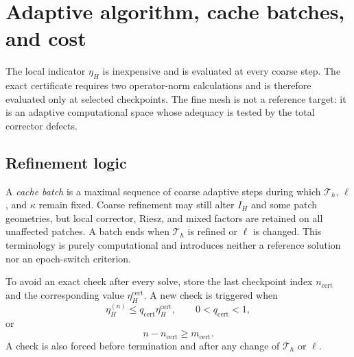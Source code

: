\section{Adaptive algorithm, cache batches, and cost}
\label{sec:adaptive}

The local indicator $\eta_H$ is inexpensive and is evaluated at every
coarse step.  The exact certificate requires two operator-norm calculations
and is therefore evaluated only at selected checkpoints.  The fine mesh is
not a reference target: it is an adaptive computational space whose
adequacy is tested by the total corrector defects.

\subsection{Refinement logic}
\label{sec:adaptive-logic}

A \emph{cache batch} is a maximal sequence of coarse adaptive steps during
which $\mathcal T_h$, $\ell$, and $\kappa$ remain fixed.  Coarse refinement
may still alter $I_H$ and some patch geometries, but local corrector, Riesz,
and mixed factors are retained on all unaffected patches.  A batch ends
when $\mathcal T_h$ is refined or $\ell$ is changed.  This terminology is
purely computational and introduces neither a reference solution nor an
epoch-switch criterion.

To avoid an exact check after every solve, store the last checkpoint index
$n_{\mathrm{cert}}$ and the corresponding value
$\eta_H^{\mathrm{cert}}$.  A new check is triggered when
\begin{equation}
\label{eq:cert-trigger-reduction}
  \eta_H^{(n)}\leq q_{\mathrm{cert}}\eta_H^{\mathrm{cert}},
  \qquad0<q_{\mathrm{cert}}<1,
\end{equation}
or
\begin{equation}
\label{eq:cert-trigger-delay}
  n-n_{\mathrm{cert}}\geq m_{\mathrm{cert}}.
\end{equation}
A check is also forced before termination and after any change of
$\mathcal T_h$ or $\ell$.


